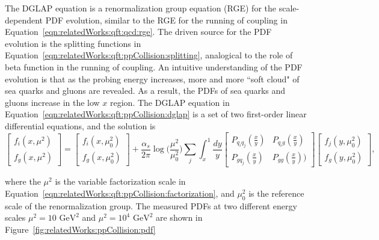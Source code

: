 \noindent The DGLAP equation is a renormalization group equation (RGE) for the scale-dependent PDF evolution, similar to the RGE for the running of coupling in Equation~\ref{eqn:relatedWorks:qft:qcd:rge}. The driven source for the PDF evolution is the splitting functions in Equation~\ref{eqn:relatedWorks:qft:ppCollision:splitting}, analogical to the role of beta function in the running of coupling.  An intuitive understanding of the PDF evolution is that as the probing energy increases, more and more ``soft cloud" of sea quarks and gluons are revealed. As a result, the PDFs of sea quarks and gluons increase in the low $x$ region. The DGLAP equation in Equation~\ref{eqn:relatedWorks:qft:ppCollision:dglap} is a set of two first-order linear differential equations, and the solution is
\begin{equation}
    \begin{bmatrix} f_i(x,\mu^2) \\ f_g(x,\mu^2) \end{bmatrix} = \begin{bmatrix} f_i(x,\mu_0^2) \\ f_g(x,\mu_0^2) \end{bmatrix} + 
    \frac{\alpha_s}{2\pi} \log\bigg(\frac{\mu^2}{\mu_0^2}\bigg) 
    \sum_j \int_x^1 
    \frac{dy}{y}
    \begin{bmatrix} P_{q_i q_j}(\frac{x}{y}) & P_{q_i g}(\frac{x}{y}) \\ P_{g q_j}(\frac{x}{y}) & P_{gg}(\frac{x}{y})) \end{bmatrix} \begin{bmatrix} f_j(y,\mu^2_0) \\ f_g(y,\mu^2_0) \end{bmatrix}, 
\end{equation}

\noindent where the $\mu^2$ is the variable factorization scale in Equation~\ref{eqn:relatedWorks:qft:ppCollision:factorization}, and $\mu^2_0$ is the reference scale of the renormalization group. The measured PDFs at two different energy scales  $\mu^2=10 \text{ GeV}^2$ and $\mu^2=10^4 \text{ GeV}^2$ are shown in Figure~\ref{fig:relatedWorks:ppCollision:pdf}


